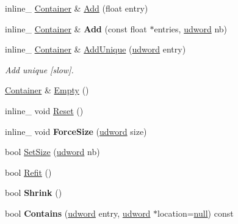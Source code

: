 \begin{DoxyCompactItemize}
\item 
inline\+\_\+ \hyperlink{class_container}{Container} \& \hyperlink{class_container_a405dd927b0f31f5d4b1307c6f17cd044}{Add} (float entry)
\item 
\hypertarget{class_container_a73c097e99165dc065ef121fd42017424}{inline\+\_\+ \hyperlink{class_container}{Container} \& {\bfseries Add} (const float $\ast$entries, \hyperlink{_ice_types_8h_a44c6f1920ba5551225fb534f9d1a1733}{udword} nb)}\label{class_container_a73c097e99165dc065ef121fd42017424}

\item 
\hypertarget{class_container_a8c6620607260e093f00238b12d2aac5a}{inline\+\_\+ \hyperlink{class_container}{Container} \& \hyperlink{class_container_a8c6620607260e093f00238b12d2aac5a}{Add\+Unique} (\hyperlink{_ice_types_8h_a44c6f1920ba5551225fb534f9d1a1733}{udword} entry)}\label{class_container_a8c6620607260e093f00238b12d2aac5a}

\begin{DoxyCompactList}\small\item\em Add unique \mbox{[}slow\mbox{]}. \end{DoxyCompactList}\item 
\hyperlink{class_container}{Container} \& \hyperlink{class_container_a48cdcc65fe70bcdf4256f5b60a1de3f3}{Empty} ()
\item 
inline\+\_\+ void \hyperlink{class_container_a6544f7c7bbc942fe6d3dde661d39214b}{Reset} ()
\item 
\hypertarget{class_container_a6e513df7e95aa3c2345baacbab50978e}{inline\+\_\+ void {\bfseries Force\+Size} (\hyperlink{_ice_types_8h_a44c6f1920ba5551225fb534f9d1a1733}{udword} size)}\label{class_container_a6e513df7e95aa3c2345baacbab50978e}

\item 
bool \hyperlink{class_container_a5556de324fa97f6dbed8f8b85cf4f6e3}{Set\+Size} (\hyperlink{_ice_types_8h_a44c6f1920ba5551225fb534f9d1a1733}{udword} nb)
\item 
bool \hyperlink{class_container_a5a91b8f53d736b761aa75f8f2df3f78a}{Refit} ()
\item 
\hypertarget{class_container_aa65ec1b97b1b97c3c7e7cff5ea8d92a1}{bool {\bfseries Shrink} ()}\label{class_container_aa65ec1b97b1b97c3c7e7cff5ea8d92a1}

\item 
\hypertarget{class_container_ab81b5847d0ca21c32b3db0d3b460d7ee}{bool {\bfseries Contains} (\hyperlink{_ice_types_8h_a44c6f1920ba5551225fb534f9d1a1733}{udword} entry, \hyperlink{_ice_types_8h_a44c6f1920ba5551225fb534f9d1a1733}{udword} $\ast$location=\hyperlink{_ice_types_8h_ac97b8ee753e4405397a42ad5799b0f9e}{null}) const }\label{class_container_ab81b5847d0ca21c32b3db0d3b460d7ee}


\end{DoxyCompactItemize}
